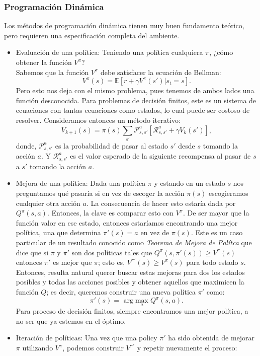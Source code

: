 \documentclass[11pt]{article}
\theoremstyle{plain}
\begin{document}
\subsubsection{Programación Dinámica}
Los métodos de programación dinámica tienen muy buen fundamento teórico, pero requieren una especificación completa del ambiente.
				\begin{itemize}
					\item Evaluación de una política: Teniendo una política cualquiera $\pi$, ¿cómo obtener la función $V^\pi$?\\
					         Sabemos que la función $V^\pi$ debe satisfacer la ecuación de Bellman:
					         \[ V^\pi (s) = \mathbb{E}[r + \gamma V^\pi (s') | s_t = s]. \]
					          Pero esto nos deja con el mismo problema, pues tenemos de ambos lados una función desconocida. Para problemas de decisión finitos, este es un sistema de ecuaciones con tantas ecuaciones como estados, lo cual puede ser costoso de resolver. Consideramos entonces un método iterativo: 
					         \[ V_{k+1} (s) = \pi(s) \sum_{s'} \mathcal{P}_{s,s'}^a [ \mathcal{R}_{s,s'}^a + \gamma V_k(s')], \]
					         donde, $\mathcal{P}_{s,s'}^a$  es la probabilidad de pasar al estado $s'$ desde $s$ tomando la acción $a$. Y $\mathcal{R}_{s,s'}^a$ es el valor esperado de la siguiente recompensa al pasar de $s$ a $s'$ tomando la acción $a$.
					\item Mejora de una política: Dada una política $\pi$ y estando en un estado $s$ nos preguntamos qué pasaría si en vez de escoger la acción $\pi(s)$ escogieramos cualquier otra acción $a$. La consecuencia de hacer esto estaría dada por $Q^{\pi}(s,a)$. Entonces, la clave es comparar esto con $V^{\pi}$. De ser mayor que la función valor en ese estado, entonces estaríamos encontrando una mejor política, una que determina $\pi'(s)=a$ en vez de $\pi(s)$. Este es un caso particular de un resultado conocido como \textit{Teorema de Mejora de Polítca} que dice que si $\pi$ y $\pi'$ son dos políticas tales que $Q^{\pi} (s, \pi'(s)) \geq V^{\pi}(s)$ entonces $\pi'$ es mejor que $\pi$; esto es, $V^{\pi'} (s) \geq V^{\pi}(s)$ para todo estado $s$.
					 Entonces, resulta natural querer buscar estas mejoras para dos los estados posibles y todas las acciones posibles y obtener aquellos que maximicen la función $Q$; es decir, queremos construir una nueva política $\pi'$ como:
					\[ \pi'(s)= \textrm{ arg} \max_a Q^\pi (s,a). \]
					Para proceso de decisión finitos, siempre encontramos una mejor política, a no ser que ya estemos en el óptimo.
					\item Iteración de políticas: Una vez que una policy $\pi' $ ha sido obtenida de mejorar $\pi$ utilizando $V^\pi$, podemos construir $V^{\pi'}$ y repetir nuevamente el proceso:

\end{itemize}
\end{document}
